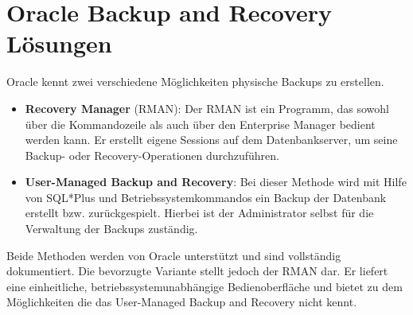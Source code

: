     \section{Oracle Backup and Recovery Lösungen}
      Oracle kennt zwei verschiedene Möglichkeiten physische Backups zu erstellen.
      \begin{itemize}
        \item \textbf{Recovery Manager} (RMAN): Der RMAN ist ein Programm, das sowohl über die Kommandozeile als auch über den Enterprise Manager bedient werden kann. Er erstellt eigene Sessions auf dem Datenbankserver, um seine Backup- oder Recovery-Operationen durchzuführen.

        \item \textbf{User-Managed Backup and Recovery}: Bei dieser Methode wird mit Hilfe von SQL*Plus und Betriebssystemkommandos ein Backup der Datenbank erstellt bzw. zurückgespielt. Hierbei ist der Administrator selbst für die Verwaltung der Backups zuständig.
      \end{itemize}
      Beide Methoden werden von Oracle unterstützt und sind vollständig dokumentiert. Die bevorzugte Variante stellt jedoch der RMAN dar. Er liefert eine einheitliche, betriebssystemunabhängige Bedienoberfläche und bietet zu dem Möglichkeiten die das User-Managed Backup and Recovery nicht kennt.
